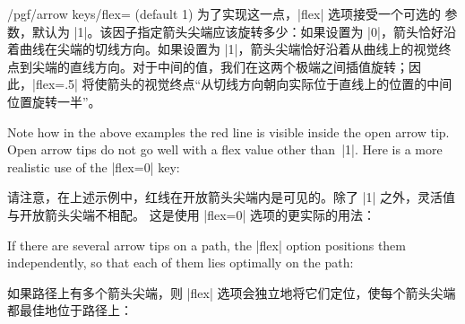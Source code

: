 \begin{key}{/pgf/arrow keys/flex= (default 1)}
    为了实现这一点，|flex| 选项接受一个可选的  参数，默认为 |1|。该因子指定箭头尖端应该旋转多少：如果设置为 |0|，箭头恰好沿着曲线在尖端的切线方向。如果设置为 |1|，箭头尖端恰好沿着从曲线上的视觉终点到尖端的直线方向。对于中间的值，我们在这两个极端之间插值旋转；因此，|flex=.5| 将使箭头的视觉终点“从切线方向朝向实际位于直线上的位置的中间位置旋转一半”。
%
\begin{codeexample}[preamble={\usetikzlibrary{arrows.meta,bending}}]
\end{codeexample}
\begin{codeexample}[preamble={\usetikzlibrary{arrows.meta,bending}}]
\end{codeexample}
    Note how in the above examples the red line is visible inside the open
    arrow tip. Open arrow tips do not go well with a flex value other than~|1|.
    Here is a more realistic use of the |flex=0| key:
    
    请注意，在上述示例中，红线在开放箭头尖端内是可见的。除了 |1| 之外，灵活值与开放箭头尖端不相配。
    这是使用 |flex=0| 选项的更实际的用法：
\begin{codeexample}[preamble={\usetikzlibrary{arrows.meta,bending}}]
\end{codeexample}
    If there are several arrow tips on a path, the |flex| option positions them
    independently, so that each of them lies optimally on the path:
    
    如果路径上有多个箭头尖端，则 |flex| 选项会独立地将它们定位，使每个箭头尖端都最佳地位于路径上：
\begin{codeexample}[preamble={\usetikzlibrary{bending}}]
\end{codeexample}
\end{key}


